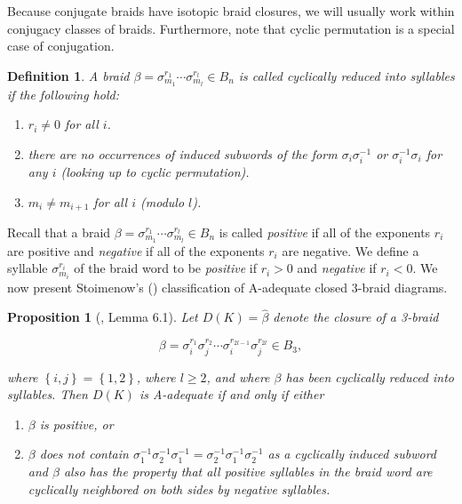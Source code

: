 \documentclass{article}
\newtheorem{definition}{Definition}[section]
\newtheorem{proposition}{Proposition}[section]
\begin{document}
Because conjugate braids have isotopic braid closures, we will usually work within conjugacy classes of braids. Furthermore, note that cyclic permutation is a special case of conjugation.

\begin{definition} A braid $\beta=\sigma_{m_{1}}^{r_{1}}\cdots\sigma_{m_{l}}^{r_{l}} \in B_{n}$ is called \emph{cyclically reduced into syllables} if the following hold:

\begin{enumerate}
\item[(1)] $r_{i}\neq 0$ for all $i$. 
\item[(2)] there are no occurrences of induced subwords of the form $\sigma_{i}\sigma_{i}^{-1}$ or $\sigma_{i}^{-1}\sigma_{i}$ for any $i$ (looking up to cyclic permutation).
\item[(3)] $m_{i}\neq m_{i+1}$ for all $i$ (modulo $l$). 
\end{enumerate}
\end{definition}

Recall that a braid $\beta=\sigma_{m_{1}}^{r_{1}}\cdots\sigma_{m_{l}}^{r_{l}} \in B_{n}$ is called \emph{positive} if all of the exponents $r_{i}$ are positive and \emph{negative} if all of the exponents $r_{i}$ are negative. We define a syllable $\sigma_{m_{i}}^{r_{i}}$ of the braid word to be \emph{positive} if $r_{i}>0$ and \emph{negative} if $r_{i}<0$. We now present Stoimenow's (\cite{Stoimenow}) classification of A-adequate closed 3-braid diagrams. 

\begin{proposition}[\cite{Stoimenow}, Lemma 6.1] 

Let $D(K)=\widehat{\beta}$ denote the closure of a 3-braid 

$$\beta=\sigma_{i}^{r_{1}}\sigma_{j}^{r_{2}}\cdots\sigma_{i}^{r_{2l-1}}\sigma_{j}^{r_{2l}} \in B_{3},$$ 

\noindent where $\left\{i,j\right\}=\left\{1,2\right\}$, where $l \geq 2$, and where $\beta$ has been cyclically reduced into syllables. Then $D(K)$ is A-adequate if and only if either 
\begin{enumerate}\label{adeq3braid}
\item[(1)] $\beta$ is positive, or
\item[(2)] $\beta$ does not contain $\sigma_{1}^{-1}\sigma_{2}^{-1}\sigma_{1}^{-1}=\sigma_{2}^{-1}\sigma_{1}^{-1}\sigma_{2}^{-1}$ as a cyclically induced subword and $\beta$ also has the property that all positive syllables in the braid word are cyclically neighbored on both sides by negative syllables.   
\end{enumerate}
\end{proposition}
\end{document}
